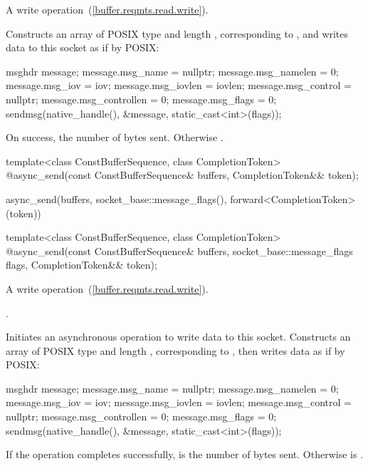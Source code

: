 \begin{itemdescr}
\pnum
A write operation~(\ref{buffer.reqmts.read.write}).

\pnum
\effects Constructs an array  of POSIX type  and length , corresponding to , and writes data to this socket as if by POSIX:
\begin{codeblock}
msghdr message;
message.msg_name = nullptr;
message.msg_namelen = 0;
message.msg_iov = iov;
message.msg_iovlen = iovlen;
message.msg_control = nullptr;
message.msg_controllen = 0;
message.msg_flags = 0;
sendmsg(native_handle(), &message, static_cast<int>(flags));
\end{codeblock}


\pnum
\returns On success, the number of bytes sent. Otherwise .
\end{itemdescr}

\begin{itemdecl}
template<class ConstBufferSequence, class CompletionToken>
  @\DEDUCED@ async_send(const ConstBufferSequence& buffers, CompletionToken&& token);
\end{itemdecl}

\begin{itemdescr}
\pnum
\returns
\begin{codeblock}
async_send(buffers, socket_base::message_flags(), forward<CompletionToken>(token))
\end{codeblock}
\end{itemdescr}

\begin{itemdecl}
template<class ConstBufferSequence, class CompletionToken>
  @\DEDUCED@ async_send(const ConstBufferSequence& buffers,
                     socket_base::message_flags flags,
                     CompletionToken&& token);
\end{itemdecl}

\begin{itemdescr}
\pnum
A write operation~(\ref{buffer.reqmts.read.write}).

\pnum
\completionsig {}.

\pnum
\effects Initiates an asynchronous operation to write data to this socket. Constructs an array  of POSIX type  and length , corresponding to , then writes data as if by POSIX:
\begin{codeblock}
msghdr message;
message.msg_name = nullptr;
message.msg_namelen = 0;
message.msg_iov = iov;
message.msg_iovlen = iovlen;
message.msg_control = nullptr;
message.msg_controllen = 0;
message.msg_flags = 0;
sendmsg(native_handle(), &message, static_cast<int>(flags));
\end{codeblock}


\pnum
If the operation completes successfully,  is the number of bytes sent. Otherwise  is .
\end{itemdescr}

